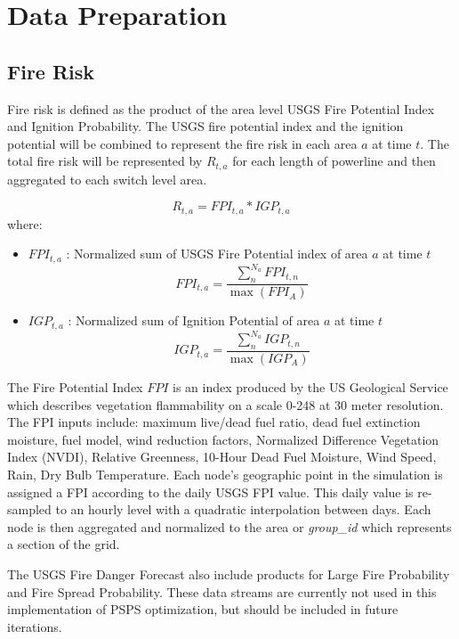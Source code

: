 \documentclass{article}
\begin{document}
\section{Data Preparation}

\subsection{Fire Risk}

Fire risk is defined as the product of the area level USGS Fire Potential Index and Ignition Probability. The USGS fire potential index and the ignition potential will be combined to represent the fire risk in each area $a$ at time $t$. The total fire risk will be represented by $R_{t,a}$ for each length of powerline and then aggregated to each switch level area.

\begin{equation}
    R_{t,a} = FPI_{t,a} * IGP_{t,a}
\end{equation}where:
\begin{itemize}
    \item $FPI_{t,a}$ : Normalized sum of USGS Fire Potential index of area $a$ at time $t$
    \begin{equation}
        FPI_{t,a}  =  \frac{\sum_{n}^{N_a}FPI_{t,n}}{\max(FPI_A)}
    \end{equation}
    \item $IGP_{t,a}$ : Normalized sum of Ignition Potential of area $a$ at time $t$
    \begin{equation}
        IGP_{t,a}  =  \frac{\sum_{n}^{N_a}IGP_{t,n}}{\max(IGP_A)}
    \end{equation}

\end{itemize}
The  Fire Potential Index $FPI$ is an index produced by the US Geological Service which describes vegetation flammability on a scale 0-248 at 30 meter resolution. The FPI inputs include: maximum live/dead fuel ratio, dead fuel extinction moisture, fuel model, wind reduction factors, Normalized Difference  Vegetation Index (NVDI), Relative Greenness, 10-Hour Dead Fuel Moisture, Wind Speed, Rain, Dry Bulb Temperature. Each node's geographic point in the simulation is assigned a FPI according to the daily USGS FPI value. This daily value is re-sampled to an hourly level with a quadratic interpolation between days. Each node is then aggregated and normalized to the area or \emph{group\_id} which represents a section of the grid.

The USGS Fire Danger Forecast also include products for Large Fire Probability and Fire Spread Probability. These data streams are currently not used in this implementation of PSPS optimization, but should be included in future iterations. 
\end{document}
